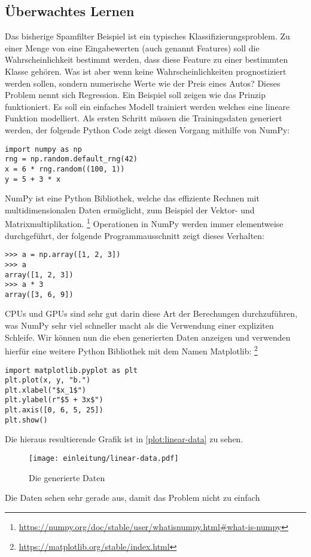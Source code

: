 \subsection{Überwachtes Lernen}
Das bisherige Spamfilter Beispiel ist ein typisches
Klassifizierungsproblem. Zu einer Menge von eine Eingabewerten
(auch genannt Features) soll die Wahrscheinlichkeit bestimmt werden,
dass diese Feature zu einer bestimmten Klasse gehören.
Was ist aber wenn keine Wahrscheinlichkeiten
prognostiziert werden sollen, sondern numerische Werte wie
der Preis eines Autos? Dieses Problem nennt sich Regression.
Ein Beispiel soll zeigen wie das Prinzip funktioniert.
Es soll ein einfaches Modell trainiert werden welches eine lineare
Funktion modelliert. Als ersten Schritt müssen die Trainingsdaten generiert werden,
der folgende Python Code zeigt diesen Vorgang mithilfe von NumPy:
\begin{lstlisting}
import numpy as np
rng = np.random.default_rng(42)
x = 6 * rng.random((100, 1))
y = 5 + 3 * x
\end{lstlisting}
NumPy ist eine Python Bibliothek, welche das effiziente Rechnen mit
multidimensionalen Daten ermöglicht, zum Beispiel der Vektor- und Matrixmultiplikation.
\footnote{\url{https://numpy.org/doc/stable/user/whatisnumpy.html\#what-is-numpy}}
Operationen in NumPy werden immer elementweise durchgeführt, der folgende Programmausschnitt
zeigt dieses Verhalten:
\begin{lstlisting}
>>> a = np.array([1, 2, 3])
>>> a
array([1, 2, 3])
>>> a * 3
array([3, 6, 9])
\end{lstlisting}
CPUs und GPUs sind sehr gut darin diese Art der Berechungen durchzuführen,
was NumPy sehr viel schneller macht als die Verwendung einer expliziten Schleife.
Wir können nun die eben generierten Daten anzeigen und verwenden hierfür
eine weitere Python Bibliothek mit dem Namen Matplotlib:
\footnote{\url{https://matplotlib.org/stable/index.html}}
\begin{lstlisting}
import matplotlib.pyplot as plt
plt.plot(x, y, "b.")
plt.xlabel("$x_1$")
plt.ylabel(r"$5 + 3x$")
plt.axis([0, 6, 5, 25])
plt.show()
\end{lstlisting}
Die hieraus resultierende Grafik ist in \autoref{plot:linear-data} zu sehen.
\newpage
\begin{figure}
  \centering
  \texttt{[image: einleitung/linear-data.pdf]}
  \caption{Die generierte Daten}
  \label{plot:linear-data}
\end{figure}
\noindent
Die Daten sehen sehr gerade aus, damit das Problem nicht zu einfach
